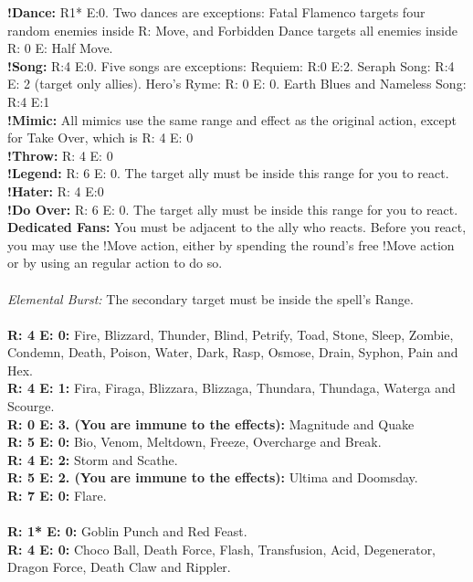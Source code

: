 %
 \ofrow
\textbf{!Dance:} R1* E:0. 
Two dances are exceptions: Fatal Flamenco targets four random enemies inside R: Move, and Forbidden Dance targets all enemies inside R: 0 E: Half Move.\\
\textbf{!Song:} R:4 E:0. Five songs are exceptions: Requiem: R:0 E:2. Seraph Song: R:4 E: 2 (target only allies). Hero’s Ryme: R: 0 E: 0. Earth Blues and Nameless Song: R:4 E:1\\
\textbf{!Mimic:} All mimics use the same range and effect as the original action, except for Take Over, which is R: 4 E: 0\\
\textbf{!Throw:} R: 4 E: 0\\
\textbf{!Legend:} R: 6 E: 0. The target ally must be inside this range for you to react.\\
\textbf{!Hater:} R: 4 E:0\\
\textbf{!Do Over:} R: 6 E: 0. The target ally must be
inside this range for you to react.\\
\textbf{Dedicated Fans:} You must be adjacent to the ally who reacts. Before you react, you may use the !Move action, either by spending the round’s free !Move action or by using an regular action to do so.
%
\\\\
%
 \ofrow
\textit{Elemental Burst:} The secondary target must be inside the spell's Range.
%
\\\\
%
 \ofrow
\textbf{R: 4 E: 0:} Fire, Blizzard, Thunder, Blind, Petrify, Toad, Stone, Sleep, Zombie, Condemn, Death, Poison, Water, Dark, Rasp,
Osmose, Drain, Syphon, Pain and Hex.\\
\textbf{R: 4 E: 1:} Fira, Firaga, Blizzara, Blizzaga, Thundara, Thundaga, Waterga and Scourge.\\
\textbf{R: 0 E: 3. (You are immune to the effects):} Magnitude and Quake \\
\textbf{R: 5 E: 0:} Bio, Venom, Meltdown, Freeze, Overcharge and Break.\\
\textbf{R: 4 E: 2:} Storm and Scathe.\\
\textbf{R: 5 E: 2. (You are immune to the effects):} Ultima and Doomsday.\\
\textbf{R: 7 E: 0:} Flare.
%
\\\\
%
 \ofrow
\textbf{R: 1* E: 0:} Goblin Punch and Red Feast.\\
\textbf{R: 4 E: 0:} Choco Ball, Death Force, Flash, Transfusion, Acid, Degenerator, Dragon Force, Death Claw and Rippler.\\
